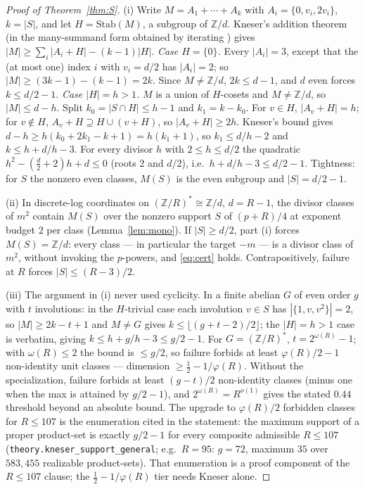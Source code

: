 \documentclass[11pt]{article}
\theoremstyle{plain}
\theoremstyle{remark}
\theoremstyle{plain}
\numberwithin{equation}{section}
\begin{document}
\begin{proof}[Proof of Theorem~\ref{thm:S}]
(i) Write $M = A_1 + \cdots + A_k$ with $A_i = \{0, v_i, 2v_i\}$,
$k = |S|$, and let $H = \mathrm{Stab}(M)$, a
subgroup of $\mathbb{Z}/d$. Kneser's addition theorem
\cite{Kneser} (in the many-summand form obtained by iterating
\cite[Thm.~5.5]{TaoVu}) gives
$|M| \ge \sum_{i} |A_i + H| - (k-1)|H|$.
\emph{Case $H = \{0\}$.} Every $|A_i| = 3$, except that the (at most
one) index $i$ with $v_i = d/2$ has $|A_i| = 2$; so
$|M| \ge (3k - 1) - (k - 1) = 2k$. Since $M \ne \mathbb{Z}/d$,
$2k \le d - 1$, and $d$ even forces $k \le d/2 - 1$.
\emph{Case $|H| = h > 1$.} $M$ is a union of $H$-cosets and
$M \ne \mathbb{Z}/d$, so $|M| \le d - h$. Split
$k_0 = |S \cap H| \le h - 1$ and $k_1 = k - k_0$. For $v \in H$,
$|A_v + H| = h$; for $v \notin H$, $A_v + H \supseteq H \cup (v + H)$,
so $|A_v + H| \ge 2h$. Kneser's bound gives
$d - h \ge h(k_0 + 2k_1 - k + 1) = h(k_1 + 1)$, so $k_1 \le d/h - 2$
and $k \le h + d/h - 3$. For every divisor $h$ with $2 \le h \le d/2$
the quadratic $h^2 - (\tfrac d2 + 2)h + d \le 0$ (roots $2$ and $d/2$),
i.e.\ $h + d/h - 3 \le d/2 - 1$. Tightness: for $S$ the nonzero even
classes, $M(S)$ is the even subgroup and $|S| = d/2 - 1$.

(ii) In discrete-log coordinates on $(\mathbb{Z}/R)^* \cong
\mathbb{Z}/d$, $d = R - 1$, the divisor classes of $m^2$ contain
$M(S)$ over the nonzero support $S$ of $(p+R)/4$ at exponent
budget $2$ per class (Lemma~\ref{lem:mono}). If $|S| \ge d/2$, part (i)
forces $M(S) = \mathbb{Z}/d$: every class --- in particular the target
$-m$ --- is a divisor class of $m^2$, without invoking the $p$-powers,
and \eqref{eq:cert} holds. Contrapositively, failure at $R$ forces
$|S| \le (R-3)/2$.

(iii) The argument in (i) never used cyclicity. In a finite abelian
$G$ of even order $g$ with $t$ involutions: in the $H$-trivial case
each involution $v \in S$ has $|\{1, v, v^2\}| = 2$, so
$|M| \ge 2k - t + 1$ and $M \ne G$ gives
$k \le \lfloor (g + t - 2)/2 \rfloor$; the $|H| = h > 1$ case is
verbatim, giving $k \le h + g/h - 3 \le g/2 - 1$. For
$G = (\mathbb{Z}/R)^*$, $t = 2^{\omega(R)} - 1$; with
$\omega(R) \le 2$ the bound is $\le g/2$, so failure
forbids at least $\varphi(R)/2 - 1$ non-identity unit
classes --- dimension $\ge \tfrac12 - 1/\varphi(R)$. Without the
specialization, failure forbids at least $(g-t)/2$ non-identity
classes (minus one when the max is attained by $g/2-1$), and
$2^{\omega(R)} = R^{o(1)}$ gives the stated $0.44$ threshold beyond an
absolute bound. The upgrade to $\varphi(R)/2$ forbidden classes for
$R \le 107$ is the enumeration cited in the statement: the maximum
support of a proper product-set is exactly $g/2 - 1$ for every
composite admissible $R \le 107$
(\texttt{theory.kneser\_support\_general}; e.g.\ $R = 95$: $g = 72$,
maximum $35$ over $583{,}455$ realizable product-sets). That
enumeration is a proof component of the $R \le 107$ clause; the
$\tfrac12 - 1/\varphi(R)$ tier needs Kneser alone.
\end{proof}
\end{document}
